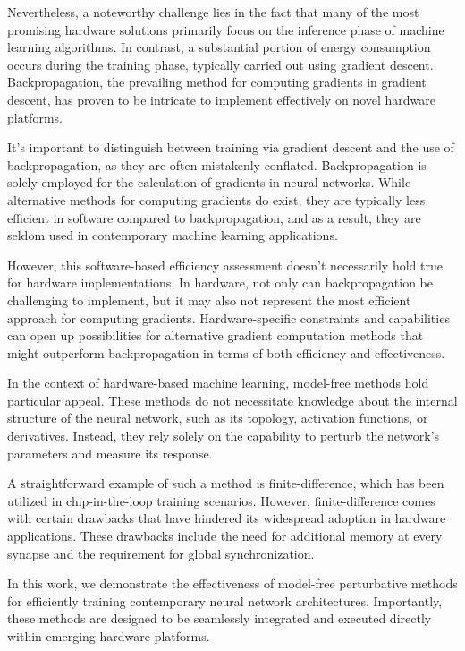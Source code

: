 \documentclass[nohyperref]{article}
\theoremstyle{plain}
\theoremstyle{definition}
\theoremstyle{remark}
\begin{document}
Nevertheless, a noteworthy challenge lies in the fact that many of the most promising hardware solutions primarily focus on the inference phase of machine learning algorithms. In contrast, a substantial portion of energy consumption occurs during the training phase, typically carried out using gradient descent. Backpropagation, the prevailing method for computing gradients in gradient descent, has proven to be intricate to implement effectively on novel hardware platforms.

It's important to distinguish between training via gradient descent and the use of backpropagation, as they are often mistakenly conflated. Backpropagation is solely employed for the calculation of gradients in neural networks. While alternative methods for computing gradients do exist, they are typically less efficient in software compared to backpropagation, and as a result, they are seldom used in contemporary machine learning applications.

However, this software-based efficiency assessment doesn't necessarily hold true for hardware implementations. In hardware, not only can backpropagation be challenging to implement, but it may also not represent the most efficient approach for computing gradients. Hardware-specific constraints and capabilities can open up possibilities for alternative gradient computation methods that might outperform backpropagation in terms of both efficiency and effectiveness.

In the context of hardware-based machine learning, model-free methods hold particular appeal. These methods do not necessitate knowledge about the internal structure of the neural network, such as its topology, activation functions, or derivatives. Instead, they rely solely on the capability to perturb the network's parameters and measure its response.

A straightforward example of such a method is finite-difference, which has been utilized in chip-in-the-loop training scenarios. However, finite-difference comes with certain drawbacks that have hindered its widespread adoption in hardware applications. These drawbacks include the need for additional memory at every synapse and the requirement for global synchronization.

In this work, we demonstrate the effectiveness of model-free perturbative methods for efficiently training contemporary neural network architectures. Importantly, these methods are designed to be seamlessly integrated and executed directly within emerging hardware platforms.
\end{document}

